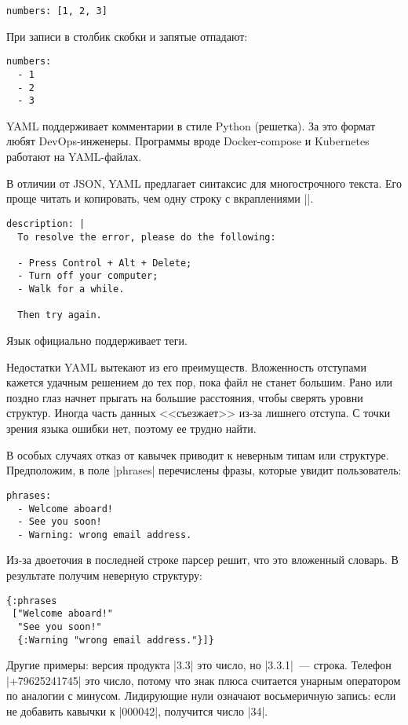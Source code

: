 \begin{verbatim}
numbers: [1, 2, 3]
\end{verbatim}

При записи в столбик скобки и запятые отпадают:

\begin{verbatim}
numbers:
  - 1
  - 2
  - 3
\end{verbatim}

YAML поддерживает комментарии в стиле Python (решетка). За это формат любят
DevOps-инженеры. Программы вроде Docker-compose и Kubernetes работают на
YAML-файлах.

В отличии от JSON, YAML предлагает синтаксис для многострочного текста. Его
проще читать и копировать, чем одну строку с вкраплениями \spverb|\n|.

\begin{verbatim}
description: |
  To resolve the error, please do the following:

  - Press Control + Alt + Delete;
  - Turn off your computer;
  - Walk for a while.

  Then try again.
\end{verbatim}

Язык официально поддерживает теги.

Недостатки YAML вытекают из его преимуществ. Вложенность отступами кажется
удачным решением до тех пор, пока файл не станет большим. Рано или поздно глаз
начнет прыгать на большие расстояния, чтобы сверять уровни структур. Иногда
часть данных <<съезжает>> из-за лишнего отступа. С точки зрения языка ошибки
нет, поэтому ее трудно найти.

В особых случаях отказ от кавычек приводит к неверным типам или
структуре. Предположим, в поле \spverb|phrases| перечислены фразы, которые
увидит пользователь:

\begin{verbatim}
phrases:
  - Welcome aboard!
  - See you soon!
  - Warning: wrong email address.
\end{verbatim}

Из-за двоеточия в последней строке парсер решит, что это вложенный словарь. В
результате получим неверную структуру:

\begin{verbatim}
{:phrases
 ["Welcome aboard!"
  "See you soon!"
  {:Warning "wrong email address."}]}
\end{verbatim}

Другие примеры: версия продукта \spverb|3.3| это число, но \spverb|3.3.1|~---
строка. Телефон \spverb|+79625241745| это число, потому что знак плюса считается
унарным оператором по аналогии с минусом. Лидирующие нули означают восьмеричную
запись: если не добавить кавычки к \spverb|000042|, получится число \spverb|34|.

